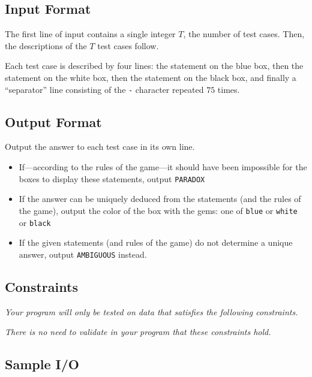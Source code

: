 \subsection*{Input Format}

The first line of input contains a single integer $T$, the number of test cases.  Then, the descriptions of the $T$ test cases follow.

Each test case is described by four lines: the statement on the blue box, then the statement on the white box, then the statement on the black box, and finally a ``separator'' line consisting of the \texttt{-} character repeated $75$ times.


\subsection*{Output Format}

Output the answer to each test case in its own line.
\begin{itemize}
    \item If---according to the rules of the game---it should have been impossible for the boxes to display these statements, output \texttt{PARADOX}
    \item If the answer can be uniquely deduced from the statements (and the rules of the game), output the color of the box with the gems: one of \texttt{blue} or \texttt{white} or \texttt{black}
    \item If the given statements (and rules of the game) do not determine a unique answer, output \texttt{AMBIGUOUS} instead.
\end{itemize}

\subsection*{Constraints}

\textit{Your program will only be tested on data that satisfies the following constraints.}


\textit{There is no need to validate in your program that these constraints hold.}

\subsection*{Sample I/O}

